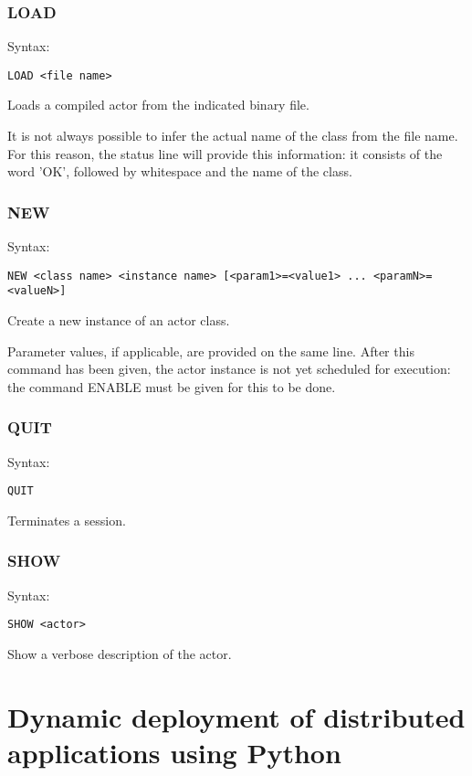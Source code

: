\documentclass[10pt, a4paper]{article}
\begin{document}
\subsubsection*{LOAD}

Syntax:
\begin{verbatim}
LOAD <file name>
\end{verbatim}

Loads a compiled actor from the indicated binary file.

It is not always possible to infer the actual name of the class from the file name. For this reason, the status line will provide this information: it consists of the word 'OK', followed by whitespace and the name of the class.

\subsubsection*{NEW}

Syntax:
\begin{verbatim}
NEW <class name> <instance name> [<param1>=<value1> ... <paramN>=<valueN>]
\end{verbatim}

Create a new instance of an actor class.

Parameter values, if applicable, are provided on the same line. After this command has been given, the actor instance is not yet scheduled for execution: the command ENABLE must be given for this to be done.

\subsubsection*{QUIT}

Syntax:
\begin{verbatim}
QUIT
\end{verbatim}

Terminates a session.

\subsubsection*{SHOW}

Syntax:
\begin{verbatim}
SHOW <actor>
\end{verbatim}

Show a verbose description of the actor.


\section{Dynamic deployment of distributed applications using Python}
\end{document}
